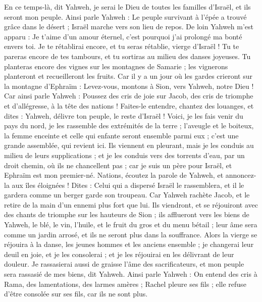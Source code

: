 \begin{multicols}{2}
\VerseOne{}En ce temps-là, dit Yahweh, je serai le Dieu de toutes les familles d'Israël, et ils seront mon peuple.
Ainsi parle Yahweh : Le peuple survivant à l'épée a trouvé grâce dans le désert ; Israël marche vers son lieu de repos.
De loin Yahweh m'est apparu : Je t'aime d'un amour éternel, c'est pourquoi j'ai prolongé ma bonté envers toi.
Je te rétablirai encore, et tu seras rétablie, vierge d'Israël ! Tu te pareras encore de tes tambours, et tu sortiras au milieu des danses joyeuses.
Tu planteras encore des vignes sur les montagnes de Samarie ; les vignerons planteront et  recueilleront les fruits.
Car il y a un jour où les gardes crieront sur la montagne d'Ephraïm : Levez-vous, montons à Sion, vers Yahweh, notre Dieu !
Car ainsi parle Yahweh : Poussez des cris de joie sur Jacob, des cris de triomphe et d’allégresse, à la tête des nations ! Faites-le entendre, chantez des louanges, et dites : Yahweh, délivre ton peuple, le reste d'Israël !
Voici, je les fais venir du pays du nord, je les rassemble des extrémités de la terre ; l'aveugle et le boiteux, la femme enceinte et celle qui enfante seront ensemble parmi eux ; c’est une grande assemblée, qui revient ici.
Ils viennent en pleurant, mais je les conduis au milieu de leurs supplications ; et je les conduis vers des torrents d'eau, par un droit chemin, où ils ne chancellent pas ; car je suis un père pour Israël, et Ephraïm est mon premier-né.
Nations, écoutez la parole de Yahweh, et annoncez-la aux îles éloignées ! Dites : Celui qui a dispersé Israël le rassemblera, et il le gardera comme un berger garde son troupeau.
Car Yahweh rachète Jacob, et le retire de la main d'un ennemi plus fort que lui.
Ils viendront, et se réjouiront avec des chants de triomphe sur les hauteurs de Sion ; ils afflueront vers les biens de Yahweh, le blé, le vin, l'huile, et le fruit du gros et du menu bétail ;  leur âme sera comme un jardin arrosé, et ils ne seront plus dans la souffrance.
Alors la vierge se réjouira à la danse, les jeunes hommes et les anciens ensemble ; je changerai leur deuil en joie, et je les consolerai ; et je les réjouirai en les délivrant de leur douleur.
Je rassasierai aussi de graisse l'âme des sacrificateurs, et mon peuple sera rassasié de mes biens, dit Yahweh.
Ainsi parle Yahweh : On entend des cris à Rama, des lamentations, des larmes amères ; Rachel pleure ses fils ; elle refuse d'être consolée sur ses fils, car ils ne sont plus.

\end{multicols}
